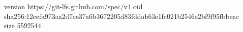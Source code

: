 version https://git-lfs.github.com/spec/v1
oid sha256:12cefa973aa2d7ce37a6b3672205d83fddab63e1fc021b2546e2bf9f95fbbeac
size 5592544
